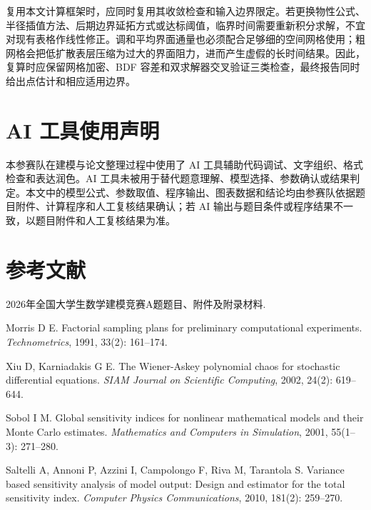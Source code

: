 \documentclass[UTF8,a4paper,12pt]{ctexart}
\numberwithin{equation}{section}
\begin{document}
复用本文计算框架时，应同时复用其收敛检查和输入边界限定。若更换物性公式、半径插值方法、后期边界延拓方式或达标阈值，临界时间需要重新积分求解，不宜对现有表格作线性修正。调和平均界面通量也必须配合足够细的空间网格使用；粗网格会把低扩散表层压缩为过大的界面阻力，进而产生虚假的长时间结果。因此，复算时应保留网格加密、BDF 容差和双求解器交叉验证三类检查，最终报告同时给出点估计和相应适用边界。

\section{AI 工具使用声明}
本参赛队在建模与论文整理过程中使用了 AI 工具辅助代码调试、文字组织、格式检查和表达润色。AI 工具未被用于替代题意理解、模型选择、参数确认或结果判定。本文中的模型公式、参数取值、程序输出、图表数据和结论均由参赛队依据题目附件、计算程序和人工复核结果确认；若 AI 输出与题目条件或程序结果不一致，以题目附件和人工复核结果为准。

\section{参考文献}
\begin{enumerate}[label={[\arabic*]},leftmargin=3em,itemsep=0pt,topsep=0pt]
  \item 2026年全国大学生数学建模竞赛A题题目、附件及附录材料.
  \item Morris D E. Factorial sampling plans for preliminary computational experiments. \textit{Technometrics}, 1991, 33(2): 161--174.
  \item Xiu D, Karniadakis G E. The Wiener-Askey polynomial chaos for stochastic differential equations. \textit{SIAM Journal on Scientific Computing}, 2002, 24(2): 619--644.
  \item Sobol I M. Global sensitivity indices for nonlinear mathematical models and their Monte Carlo estimates. \textit{Mathematics and Computers in Simulation}, 2001, 55(1--3): 271--280.
  \item Saltelli A, Annoni P, Azzini I, Campolongo F, Riva M, Tarantola S. Variance based sensitivity analysis of model output: Design and estimator for the total sensitivity index. \textit{Computer Physics Communications}, 2010, 181(2): 259--270.
\end{enumerate}
\end{document}
